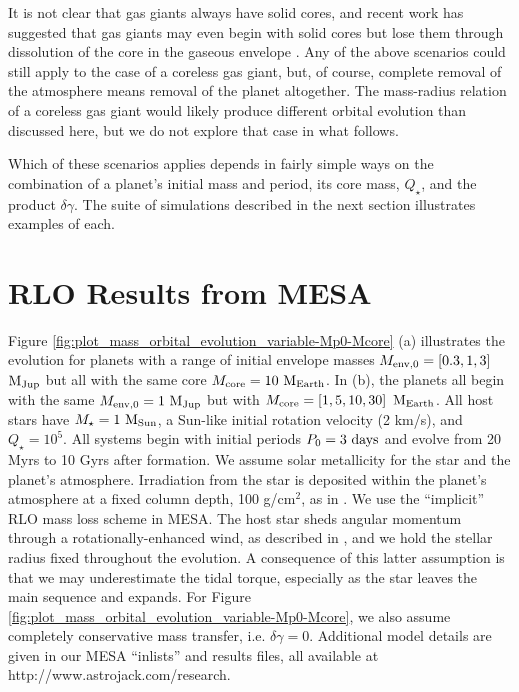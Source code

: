\documentclass{svjour3}                     %
\begin{document}
It is not clear that gas giants always have solid cores, and recent work has suggested that gas giants may even begin with solid cores but lose them through dissolution of the core in the gaseous envelope \cite{2012ApJ...745...54W}. Any of the above scenarios could still apply to the case of a coreless gas giant, but, of course, complete removal of the atmosphere means removal of the planet altogether. The mass-radius relation of a coreless gas giant would likely produce different orbital evolution than discussed here, but we do not explore that case in what follows. 

Which of these scenarios applies depends in fairly simple ways on the combination of a planet's initial mass and period, its core mass, $Q_\star$, and the product $\delta \gamma$. The suite of simulations described in the next section illustrates examples of each.

\section{RLO Results from MESA}
\label{sec:RLO_Results_from_MESA}
Figure \ref{fig:plot_mass_orbital_evolution_variable-Mp0-Mcore} (a) illustrates the evolution for planets with a range of initial envelope masses $M_{\rm env, 0} = \left[0.3, 1, 3\right]$ ${\rm M_{Jup}}$ but all with the same core $M_{\rm core} = 10\ {\rm M_{Earth}}$. In (b), the planets all begin with the same $M_{\rm env, 0} = 1\ {\rm M_{Jup}}$ but with $M_{\rm core} = \left[1, 5, 10, 30\right]\ {\rm M_{Earth}}$. All host stars have $M_\star = 1\ {\rm M_{Sun}}$, a Sun-like initial rotation velocity (2 km/s), and $Q_\star = 10^5$. All systems begin with initial periods $P_0 = 3\ {\rm days}$ and evolve from 20 Myrs to 10 Gyrs after formation. We assume solar metallicity for the star and the planet's atmosphere. Irradiation from the star is deposited within the planet's atmosphere at a fixed column depth, 100 g/cm$^2$, as in \cite{2015ApJ...813..101V}. We use the ``implicit'' RLO mass loss scheme in MESA. The host star sheds angular momentum through a rotationally-enhanced wind, as described in \cite{2013ApJS..208....4P}, and we hold the stellar radius fixed throughout the evolution. A consequence of this latter assumption is that we may underestimate the tidal torque, especially as the star leaves the main sequence and expands. For Figure \ref{fig:plot_mass_orbital_evolution_variable-Mp0-Mcore}, we also assume completely conservative mass transfer, i.e. $\delta \gamma = 0$. Additional model details are given in our MESA ``inlists'' and results files, all available at http://www.astrojack.com/research.
\end{document}
